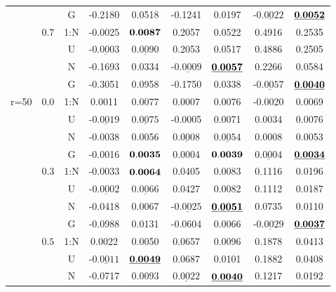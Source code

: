 \documentclass[12pt]{article}
\newcommand{\ul}{\underline}
\begin{document}
\begin{table}[htp!]
\begin{center}
{\begin{tabular}{|c|c|c|c|c|c|c|c|c| }
&		   &G&    -0.2180  & 0.0518     & -0.1241  & 0.0197   &-$\ul{0.0022}$  &${\bf\ul{0.0052}}$    \\
		        \cline{2-9}	
&		 $0.7$&1:N&    -0.0025  &${\bf 0.0087}$  & 0.2057  & 0.0522    & 0.4916  & 0.2535       \\
&		   &U&-$\ul{0.0003}$  &$\ul{0.0090}$  & 0.2053  & 0.0517   & 0.4886  & 0.2505       \\
&		   &N&    -0.1693  & 0.0334       &-$\ul{0.0009}$  &${\bf\ul{0.0057}}$  & 0.2266  & 0.0584       \\
&		   &G&    -0.3051  & 0.0958       & -0.1750  & 0.0338  &-$\ul{0.0057}$  &${\bf\ul{0.0040}}$     \\
\hline
\multirow{15}{1cm}{r=50}&	
 $0.0$&1:N&    0.0011  & 0.0077  & 0.0007  & 0.0076 & -0.0020  & 0.0069   \\
		&   &U&-$\ul{0.0019}$  &$\ul{0.0075}$  & -0.0005  & 0.0071 & 0.0034  & 0.0076  \\
		 &  &N&    -0.0038  & 0.0056  &$\ul{0.0008}$  &$\ul{0.0054}$ & 0.0008  & 0.0053  \\
		  & &G&    -0.0016  &${\bf 0.0035}$  & 0.0004  &${\bf 0.0039}$ &$\ul{0.0004}$  &${\bf\ul{0.0034}}$  \\
                 \cline{2-9}
 & $0.3$&1:N&    -0.0033  &${\bf 0.0064}$  & 0.0405  & 0.0083 &0.1116 & 0.0196 \\
&		   &U&-$\ul{0.0002}$  &$\ul{0.0066}$  & 0.0427  & 0.0082  & 0.1112  & 0.0187  \\
&	       &N&    -0.0418  & 0.0067  &-$\ul{0.0025}$  &${\bf\ul{0.0051}}$ & 0.0735  & 0.0110  \\
&		   &G&    -0.0988  & 0.0131  & -0.0604  & 0.0066 &-$\ul{0.0029}$  &${\bf\ul{0.0037}}$  \\
		        \cline{2-9}
&		 $0.5$&1:N&    0.0022  & 0.0050    & 0.0657  & 0.0096 & 0.1878  & 0.0413    \\
&		   &U&-$\ul{0.0011}$  &${\bf\ul{0.0049}}$  & 0.0687  & 0.0101 & 0.1882  & 0.0408    \\
&		   &N&    -0.0717  & 0.0093    &$\ul{0.0022}$  &${\bf\ul{0.0040}}$ & 0.1217  & 0.0192    \\

\end{tabular}}
\end{center}
\end{table}
\end{document}
